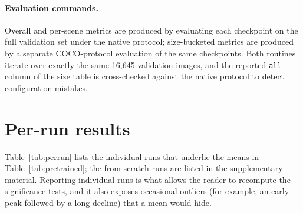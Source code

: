 \documentclass[pdflatex,sn-basic,Numbered]{sn-jnl}%
\begin{document}
\begin{appendices}
\paragraph{Evaluation commands.} Overall and per-scene metrics are produced by evaluating each checkpoint on the full validation set under the native protocol; size-bucketed metrics are produced by a separate COCO-protocol evaluation of the same checkpoints. Both routines iterate over exactly the same 16{,}645 validation images, and the reported \texttt{all} column of the size table is cross-checked against the native protocol to detect configuration mistakes.

\section{Per-run results}\label{app:runs}

Table~\ref{tab:perrun} lists the individual runs that underlie the means in Table~\ref{tab:pretrained}; the from-scratch runs are listed in the supplementary material. Reporting individual runs is what allows the reader to recompute the significance tests, and it also exposes occasional outliers (for example, an early peak followed by a long decline) that a mean would hide.


\end{appendices}
\end{document}
